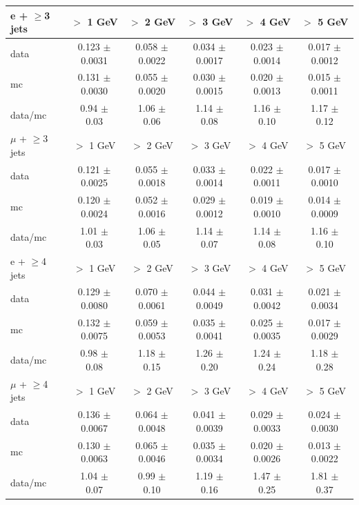 \begin{table}[!ht]
\begin{center}
\begin{tabular}{l|c|c|c|c|c}
\hline
\hline
e + $\geq$3 jets   &           $>$ 1 GeV   &           $>$ 2 GeV   &           $>$ 3 GeV   &           $>$ 4 GeV   &           $>$ 5 GeV  \\
\hline
      data   &  0.123 $\pm$ 0.0031   &  0.058 $\pm$ 0.0022   &  0.034 $\pm$ 0.0017   &  0.023 $\pm$ 0.0014   &  0.017 $\pm$ 0.0012  \\
        mc   &  0.131 $\pm$ 0.0030   &  0.055 $\pm$ 0.0020   &  0.030 $\pm$ 0.0015   &  0.020 $\pm$ 0.0013   &  0.015 $\pm$ 0.0011  \\
   data/mc   &     0.94 $\pm$ 0.03   &     1.06 $\pm$ 0.06   &     1.14 $\pm$ 0.08   &     1.16 $\pm$ 0.10   &     1.17 $\pm$ 0.12  \\

\hline
\hline
$\mu$ + $\geq$3 jets   &           $>$ 1 GeV   &           $>$ 2 GeV   &           $>$ 3 GeV   &           $>$ 4 GeV   &           $>$ 5 GeV  \\
\hline
      data   &  0.121 $\pm$ 0.0025   &  0.055 $\pm$ 0.0018   &  0.033 $\pm$ 0.0014   &  0.022 $\pm$ 0.0011   &  0.017 $\pm$ 0.0010  \\
        mc   &  0.120 $\pm$ 0.0024   &  0.052 $\pm$ 0.0016   &  0.029 $\pm$ 0.0012   &  0.019 $\pm$ 0.0010   &  0.014 $\pm$ 0.0009  \\
   data/mc   &     1.01 $\pm$ 0.03   &     1.06 $\pm$ 0.05   &     1.14 $\pm$ 0.07   &     1.14 $\pm$ 0.08   &     1.16 $\pm$ 0.10  \\

\hline
\hline
e + $\geq$4 jets   &           $>$ 1 GeV   &           $>$ 2 GeV   &           $>$ 3 GeV   &           $>$ 4 GeV   &           $>$ 5 GeV  \\
\hline
      data   &  0.129 $\pm$ 0.0080   &  0.070 $\pm$ 0.0061   &  0.044 $\pm$ 0.0049   &  0.031 $\pm$ 0.0042   &  0.021 $\pm$ 0.0034  \\
        mc   &  0.132 $\pm$ 0.0075   &  0.059 $\pm$ 0.0053   &  0.035 $\pm$ 0.0041   &  0.025 $\pm$ 0.0035   &  0.017 $\pm$ 0.0029  \\
   data/mc   &     0.98 $\pm$ 0.08   &     1.18 $\pm$ 0.15   &     1.26 $\pm$ 0.20   &     1.24 $\pm$ 0.24   &     1.18 $\pm$ 0.28  \\

\hline
\hline
$\mu$ + $\geq$4 jets   &           $>$ 1 GeV   &           $>$ 2 GeV   &           $>$ 3 GeV   &           $>$ 4 GeV   &           $>$ 5 GeV  \\
\hline
      data   &  0.136 $\pm$ 0.0067   &  0.064 $\pm$ 0.0048   &  0.041 $\pm$ 0.0039   &  0.029 $\pm$ 0.0033   &  0.024 $\pm$ 0.0030  \\
        mc   &  0.130 $\pm$ 0.0063   &  0.065 $\pm$ 0.0046   &  0.035 $\pm$ 0.0034   &  0.020 $\pm$ 0.0026   &  0.013 $\pm$ 0.0022  \\
   data/mc   &     1.04 $\pm$ 0.07   &     0.99 $\pm$ 0.10   &     1.19 $\pm$ 0.16   &     1.47 $\pm$ 0.25   &     1.81 $\pm$ 0.37  \\


\end{tabular}
\end{center}
\end{table}
